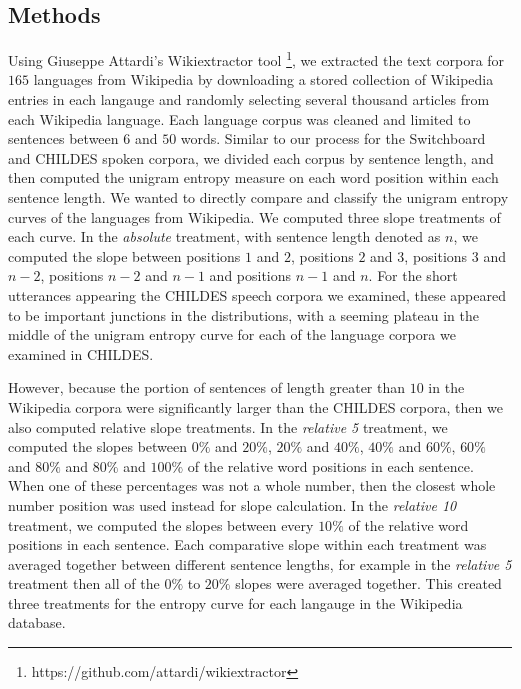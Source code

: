 \documentclass[10pt, letterpaper]{article}
\begin{document}
\hypertarget{methods-1}{%
\subsection{Methods}\label{methods-1}}

Using Giuseppe Attardi's Wikiextractor tool
\footnote{https://github.com/attardi/wikiextractor}, we extracted the
text corpora for \(165\) languages from Wikipedia by downloading a
stored collection of Wikipedia entries in each langauge and randomly
selecting several thousand articles from each Wikipedia language. Each
language corpus was cleaned and limited to sentences between \(6\) and
\(50\) words. Similar to our process for the Switchboard and CHILDES
spoken corpora, we divided each corpus by sentence length, and then
computed the unigram entropy measure on each word position within each
sentence length. We wanted to directly compare and classify the unigram
entropy curves of the languages from Wikipedia. We computed three slope
treatments of each curve. In the \emph{absolute} treatment, with
sentence length denoted as \(n\), we computed the slope between
positions \(1\) and \(2\), positions \(2\) and \(3\), positions \(3\)
and \(n-2\), positions \(n-2\) and \(n-1\) and positions \(n-1\) and
\(n\). For the short utterances appearing the CHILDES speech corpora we
examined, these appeared to be important junctions in the distributions,
with a seeming plateau in the middle of the unigram entropy curve for
each of the language corpora we examined in CHILDES.

However, because the portion of sentences of length greater than \(10\)
in the Wikipedia corpora were significantly larger than the CHILDES
corpora, then we also computed relative slope treatments. In the
\emph{relative 5} treatment, we computed the slopes between \(0\%\) and
\(20\%\), \(20\%\) and \(40\%\), \(40\%\) and \(60\%\), \(60\%\) and
\(80\%\) and \(80\%\) and \(100\%\) of the relative word positions in
each sentence. When one of these percentages was not a whole number,
then the closest whole number position was used instead for slope
calculation. In the \emph{relative 10} treatment, we computed the slopes
between every \(10\%\) of the relative word positions in each sentence.
Each comparative slope within each treatment was averaged together
between different sentence lengths, for example in the \emph{relative 5}
treatment then all of the \(0\%\) to \(20\%\) slopes were averaged
together. This created three treatments for the entropy curve for each
langauge in the Wikipedia database.
\end{document}
